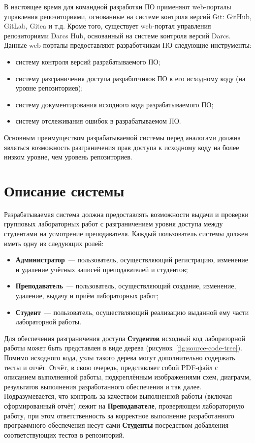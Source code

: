 \documentclass{bmstu}
\begin{document}
  В настоящее время для командной разработки ПО применяют web-порталы
  управления репозиториями, основанные на системе контроля версий Git:
  GitHub, GitLab, Gitea и т.д.
  Кроме того, существует web-портал управления репозиториями Darcs
  Hub, основанный на системе контроля версий Darcs.
  Данные web-порталы предоставляют разработчикам ПО следующие
  инструменты:
  \begin{itemize}[label=---]
    \item систему контроля версий разрабатываемого ПО;
    \item систему разграничения доступа разработчиков ПО к его
      исходному коду (на уровне репозиториев);
    \item систему документирования исходного кода разрабатываемого ПО;
    \item систему отслеживания ошибок в разрабатываемом ПО.
  \end{itemize}

  Основным преимуществом разрабатываемой системы перед аналогами
  должна являться возможность разграничения прав доступа к исходному
  коду на более низком уровне, чем уровень репозиториев.

  \section{Описание системы}

  Разрабатываемая система должна предоставлять возможности выдачи и
  проверки групповых лабораторных работ с разграничением уровня
  доступа между студентами на усмотрение преподавателя.
  Каждый пользователь системы должен иметь одну из следующих ролей:
  \begin{itemize}[label=---]
    \item \textbf{Администратор}~--- пользователь, осуществляющий
      регистрацию, изменение и удаление учётных записей преподавателей
      и студентов;
    \item \textbf{Преподаватель}~--- пользователь, осуществляющий
      создание, изменение, удаление, выдачу и приём лабораторных
      работ;
    \item \textbf{Студент}~--- пользователь, осуществляющий реализацию
      выданной ему части лабораторной работы.
  \end{itemize}

  Для обеспечения разграничения доступа \textbf{Студентов} исходный код
  лабораторной работы может быть представлен в виде дерева
  (рисунок~\ref{fig:source-code-tree}).
  Помимо исходного кода, узлы такого дерева могут дополнительно содержать тесты
  и отчёт.
  Отчёт, в свою очередь, представляет собой PDF-файл с описанием выполненной
  работы, подкреплённым изображениями схем, диаграмм, результатов выполнения
  разработанного обеспечения и так далее.
  Подразумевается, что контроль за качеством выполненной работы (включая
  сформированный отчёт) лежит на \textbf{Преподавателе}, проверяющем лабораторную работу,
  при этом ответственность за корректное выполнение разработанного программного
  обеспечения несут сами \textbf{Студенты} посредством добавления
  соответствующих тестов в репозиторий.
\end{document}
